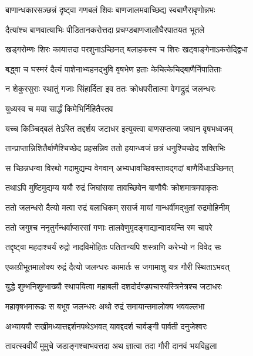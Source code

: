 \twolineshloka
{बाणान्धकारसञ्छन्नं दृष्ट्वा गणबलं शिवः}
{बाणजालमवाच्छिद्य स्वबाणैरावृणोन्नभः} %

\twolineshloka
{दैत्यांश्च बाणवात्याभिः पीडितानकरोत्तदा}
{प्रचण्डबाणजालौघैरपातयत भूतले} %

\twolineshloka
{खड्गरोम्णः शिरः कायात्तदा परशुनाऽच्छिनत्}
{बलाहकस्य च शिरः खट्वाङ्गेनाऽकरोद्द्विधा} %

\twolineshloka
{बद्ध्वा च घस्मरं दैत्यं पाशेनाभ्यहनद्भुवि}
{वृषभेण हताः केचित्केचिद्बाणैर्निपातिताः} %

\twolineshloka
{न शेकुरसुराः स्थातुं गजाः सिंहार्दिता इव}
{ततः क्रोधपरीतात्मा वेगाद्रुद्रं जलन्धरः} %




\onelineshloka
{युध्यस्व च मया सार्द्धं किमेभिर्निहितैस्तव} %

\twolineshloka
{यच्च किञ्चिद्बलं तेऽस्ति तद्दर्शय जटाधर}
{इत्युक्त्वा बाणसप्तत्या जघान वृषभध्वजम्} %

\twolineshloka
{तान्प्राप्तान्निशितैर्बाणैश्चिच्छेद प्रहसन्निव}
{ततो हयान्ध्वजं छत्रं धनुश्चिच्छेद शक्तिभिः} %

\twolineshloka
{स च्छिन्नधन्वा विरथो गदामुद्यम्य वेगवान्}
{अभ्यधावच्छिवस्तावद्गदां बाणैर्विधाऽच्छिनत्} %

\twolineshloka
{तथाऽपि मुष्टिमुद्यम्य ययौ रुद्रं जिघांसया}
{तावच्छिवेन बाणौघैः क्रोशमात्रमपाकृतः} %

\twolineshloka
{ततो जलन्धरो दैत्यो मत्वा रुद्रं बलाधिकम्}
{ससर्ज मायां गान्धर्वीमद्भुतां रुद्रमोहिनीम्} %

\twolineshloka
{ततो जगुश्च ननृतुर्गन्धर्वाप्सरसां गणाः}
{तालवेणुमृदङ्गाद्यान्वादयन्ति स्म चापरे} %

\twolineshloka
{तद्दृष्ट्वा महदाश्चर्यं रुद्रो नादविमोहितः}
{पतितान्यपि शस्त्राणि करेभ्यो न विवेद सः} %

\twolineshloka
{एकाग्रीभूतमालोक्य रुद्रं दैत्यो जलन्धरः}
{कामार्तः स जगामाशु यत्र गौरी स्थिताऽभवत्} %

\twolineshloka
{युद्धे शुम्भनिशुम्भाख्यौ स्थापयित्वा महाबली}
{दशदोर्दण्डपचास्यस्त्रिनेत्रश्च जटाधरः} %

\twolineshloka
{महावृषभमारूढः स बभूव जलन्धरः}
{अथो रुद्रं समायान्तमालोक्य भववल्लभा} %

\twolineshloka
{अभ्याययौ सखीमध्यात्तद्दर्शनपथेऽभवत्}
{यावद्ददर्श चार्वङ्गी पार्वती दनुजेश्वरः} %

\twolineshloka
{तावत्स्ववीर्यं मुमुचे जडाङ्गश्चाभवत्तदा}
{अथ ज्ञात्वा तदा गौरी दानवं भयविह्वला} %


